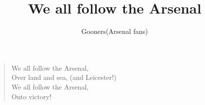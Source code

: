 \documentclass[a4paper,12pt]{article}
\title{We all follow the Arsenal}
\author{Gooners(Arsenal fans)}
\date{}
\begin{document}
	
	\maketitle
	
	\begin{verse}
		
		We all follow the Arsenal, \\
		Over land and sea, (and Leicester!) \\
		We all follow the Arsenal, \\
		Onto victory!
		
	\end{verse}
	
\end{document}

